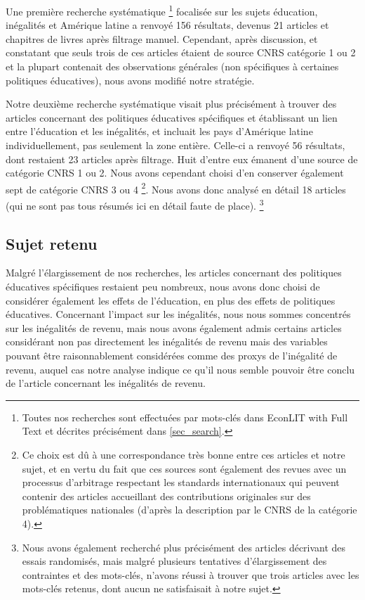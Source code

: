 \documentclass[pagesize, twoside=off, bibliography=totoc, DIV=calc, fontsize=12pt, a4paper, french]{scrartcl}
\begin{document}
Une première recherche systématique \footnote{Toutes nos recherches sont effectuées par mots-clés dans EconLIT with Full Text et décrites précisément dans \cref{sec_search}.} focalisée sur les sujets éducation, inégalités et Amérique latine a renvoyé 156 résultats, devenus 21 articles et chapitres de livres après filtrage manuel. Cependant, après discussion, et constatant que seuls trois de ces articles étaient de source CNRS catégorie 1 ou 2 et la plupart contenait des observations générales (non spécifiques à certaines politiques éducatives), nous avons modifié notre stratégie.

Notre deuxième recherche systématique visait plus précisément à trouver des articles concernant des politiques éducatives spécifiques et établissant un lien entre l’éducation et les inégalités, et incluait les pays d’Amérique latine individuellement, pas seulement la zone entière. Celle-ci a renvoyé 56 résultats, dont restaient 23 articles après filtrage. Huit d’entre eux émanent d’une source de catégorie CNRS 1 ou 2. Nous avons cependant choisi d’en conserver également sept de catégorie CNRS 3 ou 4 \footnote{Ce choix est dû à une correspondance très bonne entre ces articles et notre sujet, et en vertu du fait que ces sources sont également \og{}des revues avec un processus d’arbitrage respectant les standards internationaux\fg{} qui peuvent contenir des articles accueillant des contributions originales sur des problématiques nationales (d’après la description par le CNRS de la catégorie 4).}. Nous avons donc analysé en détail 18 articles (qui ne sont pas tous résumés ici en détail faute de place). \footnote{Nous avons également recherché plus précisément des articles décrivant des essais randomisés, mais malgré plusieurs tentatives d’élargissement des contraintes et des mots-clés, n’avons réussi à trouver que trois articles avec les mots-clés retenus, dont aucun ne satisfaisait à notre sujet.}

\subsection{Sujet retenu}

Malgré l’élargissement de nos recherches, les articles concernant des politiques éducatives spécifiques restaient peu nombreux, nous avons donc choisi de considérer également les effets de l’éducation, en plus des effets de politiques éducatives. Concernant l’impact sur les inégalités, nous nous sommes concentrés sur les inégalités de revenu, mais nous avons également admis certains articles considérant non pas directement les inégalités de revenu mais des variables pouvant être raisonnablement considérées comme des proxys de l’inégalité de revenu, auquel cas notre analyse indique ce qu’il nous semble pouvoir être conclu de l’article concernant les inégalités de revenu.
\end{document}
